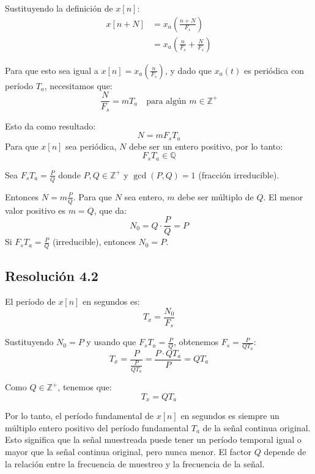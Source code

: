 \documentclass[
  11pt,
  letterpaper,
   addpoints,
   answers
  ]{exam}
\begin{document}
\begin{questions}
\begin{solution}
Sustituyendo la definición de $x[n]$:
\begin{align}
x[n+N] &= x_a\!\left(\frac{n+N}{F_s}\right) \\
&= x_a\!\left(\frac{n}{F_s} + \frac{N}{F_s}\right)
\end{align}

Para que esto sea igual a $x[n] = x_a\!\left(\frac{n}{F_s}\right)$, y dado que $x_a(t)$ es periódica con período $T_a$, necesitamos que:
\begin{equation}
\frac{N}{F_s} = mT_a \quad \text{para algún } m \in \mathbb{Z}^+
\end{equation}

Esto da como resultado:
\begin{equation}
N = mF_sT_a
\end{equation}
Para que $x[n]$ sea periódica, $N$ debe ser un entero positivo, por lo tanto:
\begin{equation}
\boxed{F_sT_a \in \mathbb{Q}}
\end{equation}

Sea $F_sT_a = \frac{P}{Q}$ donde $P, Q \in \mathbb{Z}^+$ y $\gcd(P,Q) = 1$ (fracción irreducible).

Entonces $N = m\frac{P}{Q}$. Para que $N$ sea entero, $m$ debe ser múltiplo de $Q$. El menor valor positivo es $m = Q$, que da:
\begin{equation}
\boxed{N_0 = Q \cdot \frac{P}{Q} = P}
\end{equation}
Si $F_sT_a = \frac{P}{Q}$ (irreducible), entonces $N_0 = P$.

\subsection*{Resolución 4.2}

El período de $x[n]$ en segundos es:
\begin{equation}
T_x = \frac{N_0}{F_s}
\end{equation}

Sustituyendo $N_0 = P$ y usando que $F_sT_a = \frac{P}{Q}$, obtenemos $F_s = \frac{P}{QT_a}$:
\begin{equation}
T_x = \frac{P}{\frac{P}{QT_a}} = \frac{P \cdot QT_a}{P} = QT_a
\end{equation}

Como $Q \in \mathbb{Z}^+$, tenemos que:
\begin{equation}
\boxed{T_x = QT_a}
\end{equation}

Por lo tanto, el período fundamental de $x[n]$ en segundos es siempre un múltiplo entero positivo del período fundamental $T_a$ de la señal continua original. Esto significa que la señal muestreada puede tener un período temporal igual o mayor que la señal continua original, pero nunca menor. El factor $Q$ depende de la relación entre la frecuencia de muestreo y la frecuencia de la señal.

\end{solution}

\end{questions}
\end{document}
